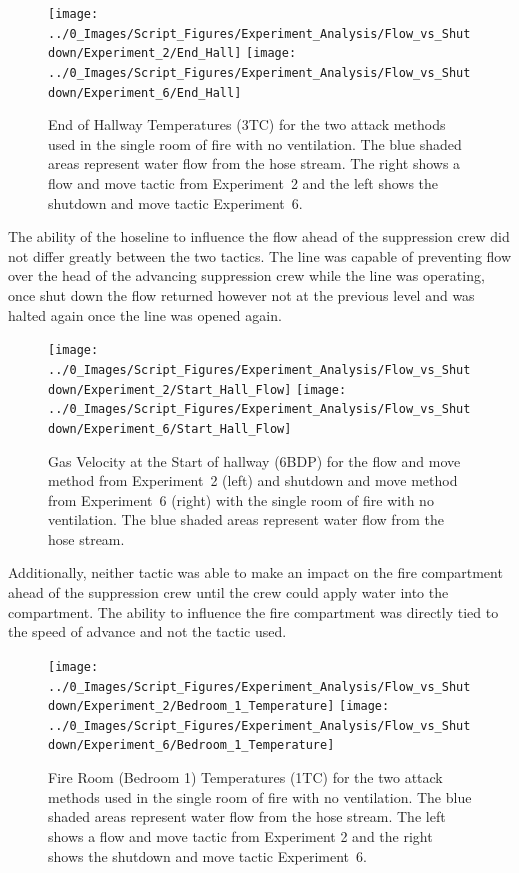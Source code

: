 \documentclass[12pt,oneside]{book}
\begin{document}
\begin{figure}[H]
\centering
\texttt{[image: ../0\_Images/Script\_Figures/Experiment\_Analysis/Flow\_vs\_Shutdown/Experiment\_2/End\_Hall]}
\texttt{[image: ../0\_Images/Script\_Figures/Experiment\_Analysis/Flow\_vs\_Shutdown/Experiment\_6/End\_Hall]}
\caption[Hall Temp. - No Vent - Flow \& Move vs. Shutdown \& Move]{End of Hallway Temperatures (3TC) for the two attack methods used in the single room of fire with no ventilation. The blue shaded areas represent water flow from the hose stream. The right shows a flow and move tactic from Experiment~2 and the left shows the shutdown and move tactic Experiment~6.}
\label{fig:Flow_vs_Shut_Single_No_Vent_TC}
\end{figure}

The ability of the hoseline to influence the flow ahead of the suppression crew did not differ greatly between the two tactics. The line was capable of preventing flow over the head of the advancing suppression crew while the line was operating, once shut down the flow returned however not at the previous level and was halted again once the line was opened again. 

\begin{figure}[H]
\centering
\texttt{[image: ../0\_Images/Script\_Figures/Experiment\_Analysis/Flow\_vs\_Shutdown/Experiment\_2/Start\_Hall\_Flow]}
\texttt{[image: ../0\_Images/Script\_Figures/Experiment\_Analysis/Flow\_vs\_Shutdown/Experiment\_6/Start\_Hall\_Flow]}
\caption[Airflow - Single Vent - Flow \& Move vs. Shutdown \& Move]{Gas Velocity at the Start of hallway (6BDP) for the flow and move method from Experiment~2 (left) and shutdown and move method from Experiment~6 (right) with the single room of fire with no ventilation. The blue shaded areas represent water flow from the hose stream.}
\label{fig:Flow_vs_Shut_Single_No_Vent_Velocity_TC}
\end{figure}

Additionally, neither tactic was able to make an impact on the fire compartment ahead of the suppression crew until the crew could apply water into the compartment. The ability to influence the fire compartment was directly tied to the speed of advance and not the tactic used. 

\begin{figure}[H]
\centering
\texttt{[image: ../0\_Images/Script\_Figures/Experiment\_Analysis/Flow\_vs\_Shutdown/Experiment\_2/Bedroom\_1\_Temperature]}
\texttt{[image: ../0\_Images/Script\_Figures/Experiment\_Analysis/Flow\_vs\_Shutdown/Experiment\_6/Bedroom\_1\_Temperature]}
\caption[Bedroom 1 Temp. - Single Vent - Flow \& Move vs. Shutdown \& Move]{Fire Room (Bedroom 1) Temperatures (1TC) for the two attack methods used in the single room of fire with no ventilation. The blue shaded areas represent water flow from the hose stream. The left shows a flow and move tactic from Experiment 2 and the right shows the shutdown and move tactic Experiment~6.}
\label{fig:Flow_vs_Shut_Single_No_Vent_Fire_Temp_TC}
\end{figure}
\end{document}
